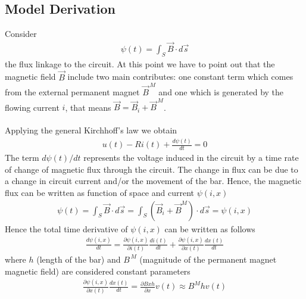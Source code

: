 \documentclass[11pt,a4paper,oneside]{book}
\numberwithin{equation}{section}
\theoremstyle{it}
\theoremstyle{definition}
\begin{document}
\subsection{Model Derivation}
Consider
\begin{equation}\label{linact_1}
	\begin{aligned}
		\psi(t) = \int_{S}^{}\vec{B}\cdot d\vec{s}
	\end{aligned}
\end{equation}
the flux linkage to the circuit. At this point we have to point out that the 
magnetic field $\vec{B}$ include two main contributes: one constant term which 
comes from the external permanent magnet $\vec{B}^{\,M}$ and one which is 
generated by the flowing current $i$, that means 
$\vec{B}=\vec{B}_i+\vec{B}^{\,M}$.\\\\
Applying the general Kirchhoff's law we obtain
\begin{equation}\label{linact_2}
	\begin{aligned}
		u(t) - Ri(t)+\frac{d\psi(t)}{dt}=0
	\end{aligned}
\end{equation}
The term ${d\psi(t)/dt}$ represents the voltage induced in the circuit by a 
time rate of change of magnetic flux through the circuit. The change in flux 
can be due to a change in circuit current and/or the movement of the bar. 
Hence, the magnetic flux can be written as function of space and current 
$\psi(i,x)$
\begin{equation}\label{linact_3}
	\begin{aligned}
		{\psi(t)}=\int_{S}^{}\vec{B}\cdot d\vec{s}=\int_{S}^{}\left( 
		\vec{B}_i+\vec{B}^M\right) \cdot d\vec{s}=\psi(i,x)
	\end{aligned}
\end{equation}
Hence the total time derivative of $\psi(i,x)$ can be written as follows
\begin{equation}\label{linact_4}
	\begin{aligned}
		\frac{d\psi(i,x)}{dt}= \frac{\partial\psi(i,x)}{\partial i(t)}\frac{d 
			i(t)}{d t} + \frac{\partial\psi(i,x)}{\partial x(t)}\frac{d x(t)}{d t}
	\end{aligned}
\end{equation}
where $h$ (length of the bar) and ${B}^{\,M}$ (magnitude of the permanent 
magnet magnetic field) are considered constant parameters
\begin{equation}\label{linact_5}
	\begin{aligned}
		\frac{\partial\psi(i,x)}{\partial x(t)}\frac{d x(t)}{d t} = 
		\frac{\partial {B}x h}{\partial x} v(t) \approx B^Mhv(t)
	\end{aligned}
\end{equation}
\end{document}
